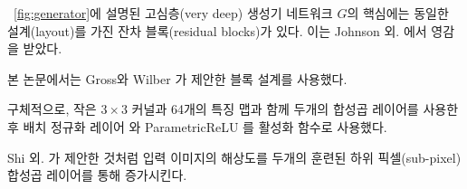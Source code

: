 \documentclass[10pt,twocolumn,letterpaper]{article}
\newcommand{\kor}[1]{#1}
\newcommand{\eng}[1]{}
\newcommand{\summary}[1]{}
\begin{document}
\eng{
At the core of our very deep generator network $G$, which is illustrated in \figurename~\ref{fig:generator} are $B$ residual blocks with identical layout. Inspired by Johnson et al.
}\kor{
\figurename~\ref{fig:generator}에 설명된 고심층(very deep) 생성기 네트워크 $G$의 핵심에는 동일한 설계(layout)를 가진 잔차 블록(residual blocks)가 있다. 이는 Johnson 외. \cite{Johnson16PercepLoss}에서 영감을 받았다.
} \eng{
we employ the block layout proposed by Gross and Wilber \cite{gross2016}.
}\kor{
본 논문에서는 Gross와 Wilber \cite{gross2016}가 제안한 블록 설계를 사용했다.
} \eng{
Specifically, we use two convolutional layers with small $3\times3$ kernels and 64 feature maps followed by batch-normalization layers \cite{Ioffe2015} and ParametricReLU \cite{He2015relu} as the activation function.
}\kor{
구체적으로, 작은 $3\times3$ 커널과 64개의 특징 맵과 함께 두개의 합성곱 레이어를 사용한 후 배치 정규화 레이어 \cite{Ioffe2015}와 ParametricReLU \cite{He2015relu}를 활성화 함수로 사용했다.
}
\eng{
We increase the resolution of the input image with two trained sub-pixel convolution layers as proposed by Shi et al. \cite{Shi2016ESPCN}.
}\kor{
Shi 외. \cite{Shi2016ESPCN}가 제안한 것처럼 입력 이미지의 해상도를 두개의 훈련된 하위 픽셀(sub-pixel) 합성곱 레이어를 통해 증가시킨다.
}

\summary{
잔차 블록을 사용하는 고심층 생성기 네트워크 G의 구조: 3x3 커널, 64개의 특징 맵, 두개의 합성곱 레이어, 배치 정규화 레이어, 활성화 함수로 ParametricRELU 사용
}
\end{document}
